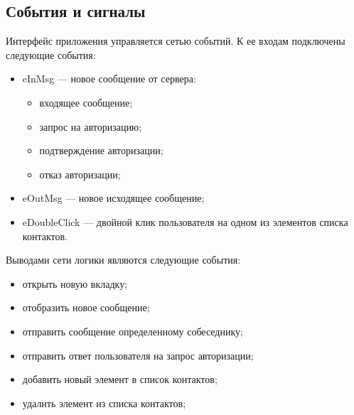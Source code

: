 \subsection{События и сигналы}\label{events_and_signals}
Интерфейс приложения управляется сетью событий.
К ее входам подключены следующие события:
\begin{itemize}
    \item eInMsg --- новое сообщение от сервера:
    \begin{itemize}
        \item входящее сообщение;
        \item запрос на авторизацию;
        \item подтверждение авторизации;
        \item отказ авторизации;
    \end{itemize}
    \item eOutMsg --- новое исходящее сообщение;
    \item eDoubleClick --- двойной клик пользователя на одном из элементов списка контактов.
\end{itemize}
Выводами сети логики являются следующие события:
\begin{itemize}
    \item открыть новую вкладку;
    \item отобразить новое сообщение;
    \item отправить сообщение определенному собеседнику;
    \item отправить ответ пользователя на запрос авторизации;
    \item добавить новый элемент в список контактов;
    \item удалить элемент из списка контактов;
\end{itemize}


